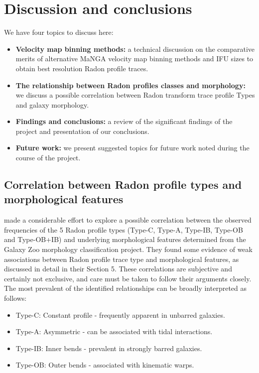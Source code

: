 \section{Discussion and conclusions}
\label{sec:discussion}
We have four topics to discuss here:
\begin{itemize}
\item \textbf{Velocity map binning methods:} a technical discussion on the comparative merits of alternative MaNGA velocity map binning methods and IFU sizes to obtain best resolution Radon profile traces.
\item \textbf{The relationship between Radon profiles classes and morphology:} we discuss a possible correlation between Radon transform trace profile Types and galaxy morphology.
\item \textbf{Findings and conclusions:} a review of the significant findings of the project and presentation of our conclusions.
\item \textbf{Future work:} we present suggested topics for future work noted during the course of the project. 
\end{itemize}



\subsection[Correlation between Radon profiles and morphology]{Correlation between Radon profile types and morphological features}
\label{correlations}
\cite{2018MNRAS.480.2217S} made a considerable effort to explore a possible correlation between the observed frequencies of the 5 Radon profile types (Type-C, Type-A, Type-IB, Type-OB and Type-OB+IB) and underlying morphological features determined from the Galaxy Zoo morphology classification project. They found some evidence of weak associations between Radon profile trace type and morphological features, as discussed in detail in their Section 5. These correlations are subjective and certainly not exclusive, and care must be taken to follow their arguments closely. The most prevalent of the identified relationships can be broadly interpreted as follows:
\begin{itemize}
    \item Type-C: Constant profile - frequently apparent in unbarred galaxies.
    \item Type-A: Asymmetric - can be associated with tidal interactions.
    \item Type-IB: Inner bends - prevalent in strongly barred galaxies.
    \item Type-OB: Outer bends - associated with kinematic warps.
\end{itemize}


